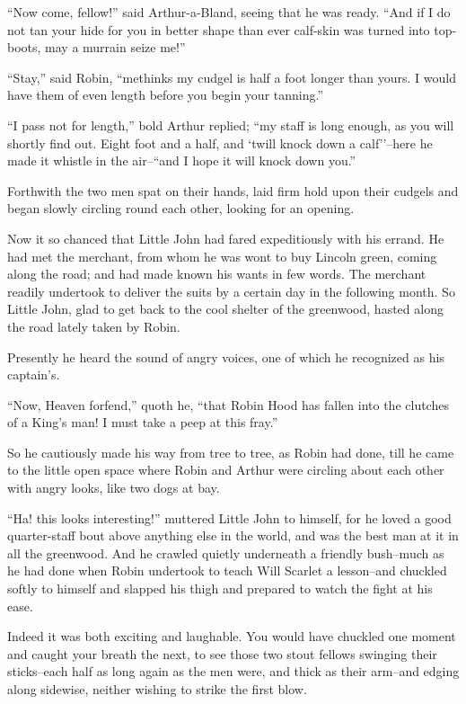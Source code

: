 ``Now come, fellow!'' said Arthur-a-Bland, seeing that he was ready.
``And if I do not tan your hide for you in better shape than ever
calf-skin was turned into top-boots, may a murrain seize me!''

``Stay,'' said Robin, ``methinks my cudgel is half a foot longer than
yours. I would have them of even length before you begin your tanning.''

``I pass not for length,'' bold Arthur replied; ``my staff is long
enough, as you will shortly find out. Eight foot and a half, and `twill
knock down a calf''--here he made it whistle in the air--``and I hope it
will knock down you.''

Forthwith the two men spat on their hands, laid firm hold upon their
cudgels and began slowly circling round each other, looking for an
opening.

Now it so chanced that Little John had fared expeditiously with his
errand. He had met the merchant, from whom he was wont to buy Lincoln
green, coming along the road; and had made known his wants in few words.
The merchant readily undertook to deliver the suits by a certain day in
the following month. So Little John, glad to get back to the cool
shelter of the greenwood, hasted along the road lately taken by Robin.

Presently he heard the sound of angry voices, one of which he recognized
as his captain's.

``Now, Heaven forfend,'' quoth he, ``that Robin Hood has fallen into the
clutches of a King's man! I must take a peep at this fray.''

So he cautiously made his way from tree to tree, as Robin had done, till
he came to the little open space where Robin and Arthur were circling
about each other with angry looks, like two dogs at bay.

``Ha! this looks interesting!'' muttered Little John to himself, for he
loved a good quarter-staff bout above anything else in the world, and
was the best man at it in all the greenwood. And he crawled quietly
underneath a friendly bush--much as he had done when Robin undertook to
teach Will Scarlet a lesson--and chuckled softly to himself and slapped
his thigh and prepared to watch the fight at his ease.

Indeed it was both exciting and laughable. You would have chuckled one
moment and caught your breath the next, to see those two stout fellows
swinging their sticks--each half as long again as the men were, and
thick as their arm--and edging along sidewise, neither wishing to strike
the first blow.

